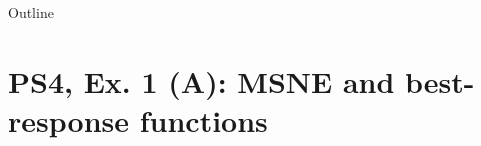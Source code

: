 

\maketitle

\begin{frame}{Outline}
    \tableofcontents
\end{frame}

\section{PS4, Ex. 1 (A): MSNE and best-response functions}

